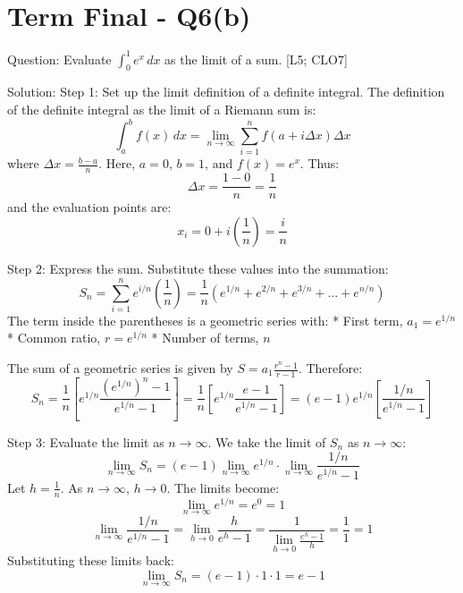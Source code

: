 \documentclass[11pt, a4paper]{article}
\begin{document}


\section*{Term Final - Q6(b)}

Question:
Evaluate $\int_{0}^{1} e^x \, dx$ as the limit of a sum. [L5; CLO7]

Solution:
Step 1: Set up the limit definition of a definite integral.
The definition of the definite integral as the limit of a Riemann sum is:
\[
\int_{a}^{b} f(x) \, dx = \lim_{n \to \infty} \sum_{i=1}^{n} f(a + i \Delta x) \Delta x
\]
where $\Delta x = \frac{b-a}{n}$.
Here, $a = 0$, $b = 1$, and $f(x) = e^x$.
Thus:
\[
\Delta x = \frac{1-0}{n} = \frac{1}{n}
\]
and the evaluation points are:
\[
x_i = 0 + i \left(\frac{1}{n}\right) = \frac{i}{n}
\]

Step 2: Express the sum.
Substitute these values into the summation:
\[
S_n = \sum_{i=1}^{n} e^{i/n} \left(\frac{1}{n}\right) = \frac{1}{n} \left( e^{1/n} + e^{2/n} + e^{3/n} + \dots + e^{n/n} \right)
\]
The term inside the parentheses is a geometric series with:
* First term, $a_1 = e^{1/n}$
* Common ratio, $r = e^{1/n}$
* Number of terms, $n$

The sum of a geometric series is given by $S = a_1 \frac{r^n - 1}{r - 1}$. Therefore:
\[
S_n = \frac{1}{n} \left[ e^{1/n} \frac{(e^{1/n})^n - 1}{e^{1/n} - 1} \right] = \frac{1}{n} \left[ e^{1/n} \frac{e - 1}{e^{1/n} - 1} \right] = (e - 1) e^{1/n} \left[ \frac{1/n}{e^{1/n} - 1} \right]
\]

Step 3: Evaluate the limit as $n \to \infty$.
We take the limit of $S_n$ as $n \to \infty$:
\[
\lim_{n \to \infty} S_n = (e - 1) \lim_{n \to \infty} e^{1/n} \cdot \lim_{n \to \infty} \frac{1/n}{e^{1/n} - 1}
\]
Let $h = \frac{1}{n}$. As $n \to \infty$, $h \to 0$.
The limits become:
\[
\lim_{n \to \infty} e^{1/n} = e^0 = 1
\]
\[
\lim_{n \to \infty} \frac{1/n}{e^{1/n} - 1} = \lim_{h \to 0} \frac{h}{e^h - 1} = \frac{1}{\lim_{h \to 0} \frac{e^h - 1}{h}} = \frac{1}{1} = 1
\]
Substituting these limits back:
\[
\lim_{n \to \infty} S_n = (e - 1) \cdot 1 \cdot 1 = e - 1
\]
\end{document}
